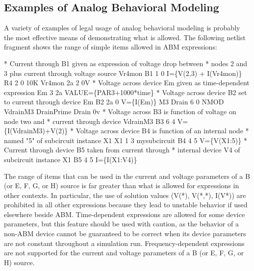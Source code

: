 \subsection{Examples of Analog Behavioral Modeling}
A variety of examples of legal usage of analog behavioral modeling is
probably the most effective means of demonstrating what is
allowed. The following netlist fragment shows the range of 
simple items allowed in ABM  expressions:

\begin{vquote}
\color{blue}* Current through B1 given as expression of voltage drop between 
* nodes 2 and 3 plus current through voltage source Vr4mon\color{black}
B1  1  0  I=\{V(2,3) + I(Vr4mon)\}
R4  2  0  10K
Vr4mon  2a 2  0V
\color{blue}* Voltage across device Em given as time-dependent expression \color{black}
Em  3  2a  VALUE=\{PAR3+1000*time\}
\color{blue}* Voltage across device B2 set to  current through device Em\color{black}
B2  2a  0  V=\{I(Em)\}
M3  Drain  6  0  NMOD
VdrainM3 DrainPrime Drain 0v
\color{blue}* Voltage across B3 is function of voltage on node two and 
* current through device VdrainM3\color{black}
B3  6  4  V=\{I(VdrainM3)+V(2)\}
\color{blue}* Voltage across device B4 is function of an internal node 
* named "5" of subcircuit instance X1\color{black}
X1 1 3 mysubcircuit
B4 4 5 V=\{V(X1:5)\}
\color{blue}* Current through device B5 taken from current through 
* internal device V4 of subcircuit instance X1\color{black}
B5 4 5 I=\{I(X1:V4)\}
\end{vquote}

The range of items that can be used in the current and voltage
parameters of a B (or E, F, G, or H) source is far greater than what
is allowed for expressions in other contexts. In particular, the use
of solution values (V(*), V(*,*), I(V*)) are prohibited in all other
expressions because they lead to unstable behavior if used
elsewhere beside ABM. Time-dependent expressions are allowed for some device
parameters, but this feature should be used with caution, as the
behavior of a non-ABM device cannot be guaranteed to be correct when its 
device parameters are not constant throughout a simulation run.
Frequency-dependent expressions are not supported for the current and voltage
parameters of a B (or E, F, G, or H) source.

